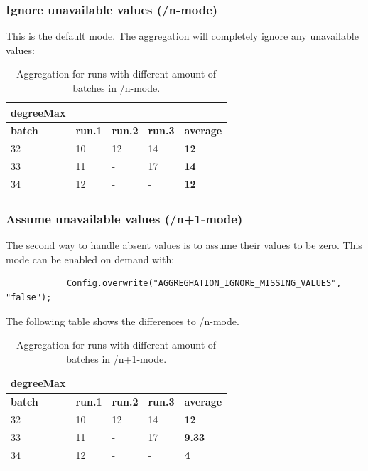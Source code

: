 \subsubsection{Ignore unavailable values (/n-mode)}
This is the default mode. The aggregation will completely ignore any unavailable values:
\begin{table}[h]
\centering
\begin{tabular}[h]{|l|l|l|l||l|}\hline
	\textbf{degreeMax} & & & &\\
	\hline
	\textbf{batch} & \textbf{run.1} & \textbf{run.2} & \textbf{run.3} & \textbf{average}\\
	\hline
	32 & 10 & 12 & 14 & \textbf{12}\\
	\hline
	33 & 11 & - & 17 & \textbf{14}\\
	\hline
	34 & 12 & - & - & \textbf{12}\\
	\hline
\end{tabular}
\caption{Aggregation for runs with different amount of batches in /n-mode.}
\label{tab:nmode}
\end{table}

\subsubsection{Assume unavailable values (/n+1-mode)}
The second way to handle absent values is to assume their values to be zero. This mode can be enabled on demand with:
\begin{lstlisting}
			Config.overwrite("AGGREGHATION_IGNORE_MISSING_VALUES", "false");
\end{lstlisting}
The following table shows the differences to /n-mode.
\begin{table}[h]
\centering
\begin{tabular}[h]{|l|l|l|l||l|}\hline
	\textbf{degreeMax} & & & &\\
	\hline
	\textbf{batch} & \textbf{run.1} & \textbf{run.2} & \textbf{run.3} & \textbf{average}\\
	\hline
	32 & 10 & 12 & 14 & \textbf{12}\\
	\hline
	33 & 11 & - & 17 & \textbf{9.33}\\
	\hline
	34 & 12 & - & - & \textbf{4}\\
	\hline
\end{tabular}
\caption{Aggregation for runs with different amount of batches in /n+1-mode.}
\label{tab:nmode}
\end{table}


